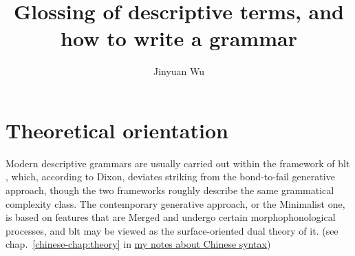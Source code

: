 \documentclass{article}
\title{Glossing of descriptive terms, and how to write a grammar}
\author{Jinyuan Wu}
\newcommand*{\citechap}[1]{chap.~{#1}}
\newcommand{\chinese}{\href{../Chinese/main.pdf}{my notes about Chinese syntax}}
\begin{document}
\maketitle

\section{Theoretical orientation}

Modern descriptive grammars are usually carried out within the framework of \ac{blt} 
\citep{dixon2009basic1,dixon2010basic2,dixon2012basic3},
which, according to Dixon, deviates striking from the bond-to-fail generative approach,
though the two frameworks roughly describe the same grammatical complexity class.
The contemporary generative approach, or the Minimalist one, 
is based on features that are Merged and undergo certain morphophonological processes,
and \ac{blt} may be viewed as the surface-oriented dual theory of it.
(see \citechap{\ref{chinese-chap:theory}} in \chinese)
\end{document}
